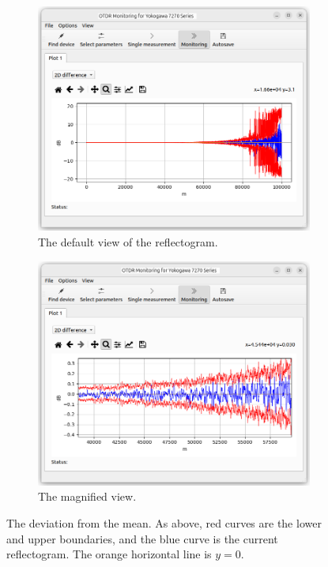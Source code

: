 \begin{figure}
	\begin{subfigure}[b]{0.5\textwidth}
		\centering
		\includegraphics{pictures/averager2ddiff.png}
		\caption{The default view of the reflectogram.}
	\end{subfigure}
	\hfill
	\begin{subfigure}[b]{0.5\textwidth}
		\centering
		\includegraphics{pictures/averager2ddiff_zoom.png}
		\caption{The magnified view.}
	\end{subfigure}
	
	\caption{The deviation from the mean. As above, red curves are the lower and upper boundaries, and the blue curve is the current reflectogram. The orange horizontal line is $y = 0$.	}
\end{figure}
